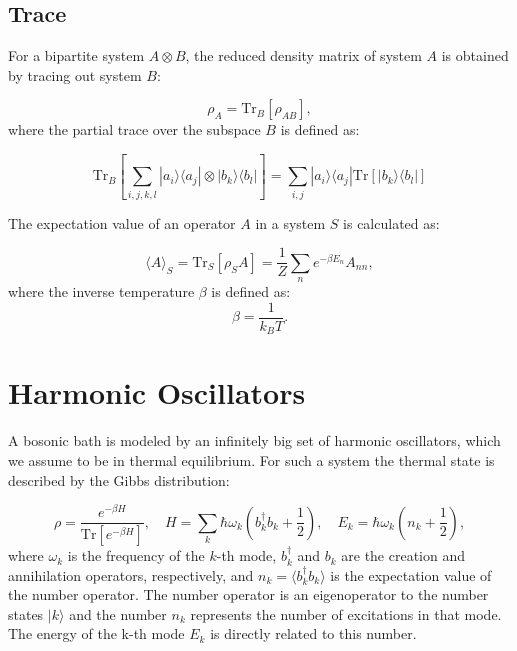 
\subsection{Trace}
For a bipartite system \( A \otimes B \), the reduced density matrix of system \( A \) is obtained by tracing out system \( B \):

\begin{equation} \label{eq:partial_trace}
	\rho_A = \mathrm{Tr}_B[\rho_{AB}],
\end{equation}
where the partial trace over the subspace \( B \) is defined as:

\begin{equation} \label{eq:partial_trace_definition}
	\mathrm{Tr}_B\left[\sum_{i,j,k,l} | a_i \rangle \langle a_j | \otimes | b_k \rangle \langle b_l | \right] = \sum_{i,j} | a_i \rangle \langle a_j | \mathrm{Tr}\left[ | b_k \rangle \langle b_l | \right]
\end{equation}

The expectation value of an operator \( A \) in a system \( S \) is calculated as:

\begin{equation} \label{eq:expectation_value}
	\langle A \rangle_S = \mathrm{Tr}_S[\rho_S A] = \frac{1}{Z} \sum_n e^{-\beta E_n} A_{nn},
\end{equation}
where the inverse temperature \(\beta\) is defined as:
\begin{equation} \label{eq:beta_definition}
	\beta = \frac{1}{k_B T}.
\end{equation}


\section{Harmonic Oscillators}
A bosonic bath is modeled by an infinitely big set of harmonic oscillators, which we assume to be in thermal equilibrium.
For such a system the thermal state is described by the Gibbs distribution:

\begin{equation} \label{eq:gibbs_state}
	\rho = \frac{e^{-\beta H}}{\mathrm{Tr}\left[e^{-\beta H}\right]}, \quad H = \sum_k \hbar \omega_k \left(b_k^{\dagger} b_k + \frac{1}{2}\right), \quad E_k = \hbar \omega_k (n_k + \frac{1}{2}),
\end{equation}
where \( \omega_k \) is the frequency of the \( k \)-th mode, \( b_k^{\dagger} \) and \( b_k \) are the creation and annihilation operators, respectively, and \( n_k = \langle b_k^{\dagger} b_k \rangle \) is the expectation value of the  number operator.
The number operator is an eigenoperator to the number states \(|k\rangle\)
and the number $n_k$ represents the number of excitations in that mode.
The energy of the k-th mode $ E_k $ is directly related to this number.

